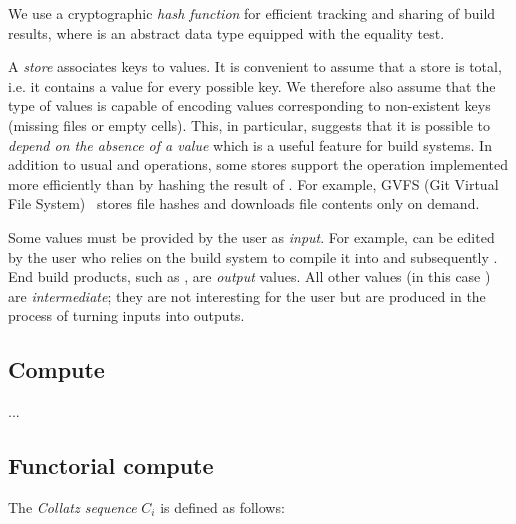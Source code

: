 We use a cryptographic \emph{hash function}  for efficient
tracking and sharing of build results, where  is an abstract data type
equipped with the equality test.

A \emph{store} associates keys to values. It is convenient to assume that a store
is total, i.e. it contains a value for every possible key. We therefore also
assume that the type of values is capable of encoding values corresponding to
non-existent keys (missing files or empty cells). This, in particular, suggests
that it is possible to \emph{depend on the absence of a value} which is a useful
feature for build systems. In addition to usual  and  operations,
some stores support the  operation implemented more efficiently than
by hashing the result of . For example, GVFS (Git Virtual File
System)~\cite{gvfs} stores file hashes and downloads file contents only on demand.

Some values must be provided by the user as \emph{input}. For example,
 can be edited by the user who relies on the build system to
compile it into  and subsequently . End build products,
such as , are \emph{output} values. All other values (in this case
) are \emph{intermediate}; they are not interesting for the user
but are produced in the process of turning inputs into outputs.

\subsection{Compute}\label{sec-general-compute}

...

\subsection{Functorial compute}\label{sec-compute-functor}

The \emph{Collatz sequence} $C_i$ is defined as follows:

